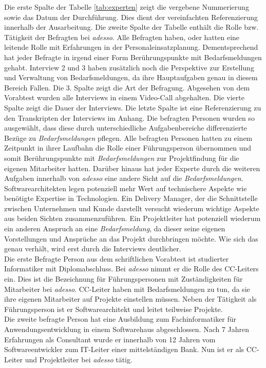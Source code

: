 Die erste Spalte der Tabelle \ref{tab:experten} zeigt die vergebene Nummerierung sowie das Datum der Durchführung. Dies dient der vereinfachten Referenzierung innerhalb der Ausarbeitung. Die zweite Spalte der Tabelle enthält die Rolle bzw. Tätigkeit der Befragten bei \emph{adesso}. Alle Befragten haben, oder hatten eine leitende Rolle mit Erfahrungen in der Personaleinsatzplanung. Dementsprechend hat jeder Befragte in irgend einer Form Berührungspunkte mit Bedarfsmeldungen gehabt. Interview 2 und 3 haben zusätzlich noch die Perspektive zur Erstellung und Verwaltung von Bedarfsmeldungen, da ihre Hauptaufgaben genau in diesem Bereich Fallen. Die 3. Spalte zeigt die Art der Befragung. Abgesehen von dem Vorabtest wurden alle Interviews in einem Video-Call abgehalten. Die vierte Spalte zeigt die Dauer der Interviews. Die letzte Spalte ist eine Referenzierung zu den Transkripten der Interviews im Anhang. Die befragten Personen wurden so ausgewählt, dass diese durch unterschiedliche Aufgabenbereiche differenzierte Bezüge zu \emph{Bedarfsmeldungen} pflegen. Alle befragten Personen hatten zu einem Zeitpunkt in ihrer Laufbahn die Rolle einer Führungsperson übernommen und somit Berührungspunkte mit \emph{Bedarfsmeldungen} zur Projektfindung für die eigenen Mitarbeiter hatten. Darüber hinaus hat jeder Experte durch die weiteren Aufgaben innerhalb von \emph{adesso} eine andere Sicht auf die \emph{Bedarfsmeldungen}. Softwarearchitekten legen potenziell mehr Wert auf technischere Aspekte wie benötigte Expertise in Technologien. Ein Delivery Manager, der die Schnittstelle zwischen Unternehmen und Kunde darstellt versucht wiederum wichtige Aspekte aus beiden Sichten zusammenzuführen. Ein Projektleiter hat potenziell wiederum ein anderen Anspruch an eine \emph{Bedarfsmeldung}, da dieser seine eigenen Vorstellungen und Ansprüche an das Projekt durchbringen möchte. Wie sich das genau verhält, wird erst durch die Interviews deutlicher.\\

Die erste Befragte Person aus dem schriftlichen Vorabtest ist studierter Informatiker mit Diplomabschluss. Bei \emph{adesso} nimmt er die Rolle des CC-Leiters ein. Dies ist die Bezeichnung für Führungspersonen mit Zuständigkeiten für Mitarbeiter bei \emph{adesso}. CC-Leiter haben mit Bedarfsmeldungen zu tun, da sie ihre eigenen Mitarbeiter auf Projekte einstellen müssen. Neben der Tätigkeit als Führungsperson ist er Softwarearchitekt und leitet teilweise Projekte.\\

Die zweite befragte Person hat eine Ausbildung zum Fachinformatiker für Anwendungsentwicklung in einem Softwarehaus abgeschlossen. Nach 7 Jahren Erfahrungen als Consultant wurde er innerhalb von 12 Jahren vom Softwareentwickler zum IT-Leiter einer mittelständigen Bank. Nun ist er als CC-Leiter und Projektleiter bei \emph{adesso} tätig.\\

